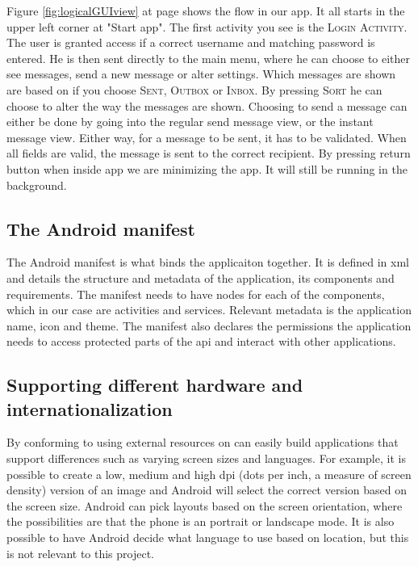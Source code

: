 Figure \ref{fig:logicalGUIview} at page \pageref{fig:logicalGUIview} shows the flow in our app. It all starts in the upper left corner at "Start app". The first activity you see is the \textsc{Login Activity}. The user is granted access if a correct username and matching password is entered. He is then sent directly to the main menu, where he can choose to either see messages, send a new message or alter settings. Which messages are shown are based on if you choose \textsc{Sent}, \textsc{Outbox} or \textsc{Inbox}. By pressing \textsc{Sort} he can choose to alter the way the messages are shown. Choosing to send a message can either be done by going into the regular send message view, or the instant message view. Either way, for a message to be sent, it has to be validated. When all fields are valid, the message is sent to the correct recipient. By pressing return button when inside app we are minimizing the app. It will still be running in the background.

\subsection{The Android manifest}
The Android manifest \cite{bib:aman} is what binds the applicaiton together. It is defined in \gls{xml} and details the structure and metadata of the application, its components and requirements. The manifest needs to have nodes for each of the components, which in our case are activities and services. Relevant metadata is the application name, icon and theme. The manifest also declares the permissions the application needs to access protected parts of the \gls{api} and interact with other applications.

\subsection{Supporting different hardware and internationalization}
By conforming to using external resources on can easily build applications that support differences such as varying screen sizes and languages. For example, it is possible to create a low, medium and high dpi (dots per inch, a measure of screen density) version of an image and Android will select the correct version based on the screen size. Android can pick layouts based on the screen orientation, where the possibilities are that the phone is an portrait or landscape mode. It is also possible to have Android decide what language to use based on location, but this is not relevant to this project. 


